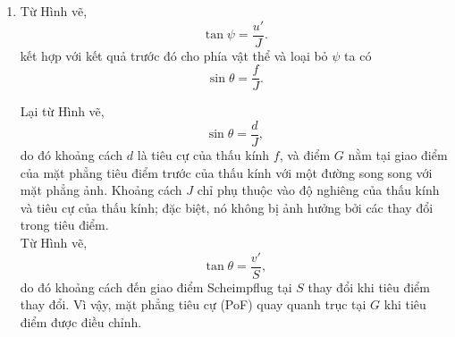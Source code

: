 \begin{enumerate}[label=(\alph*)]
\item Từ Hình vẽ,
\begin{equation}
\tan \psi = \dfrac{u'}{J}.
\end{equation}
kết hợp với kết quả trước đó cho phía vật thể và loại bỏ $\psi$ ta có
\begin{equation}
\sin \theta = \dfrac{f}{J}.
\end{equation}

Lại từ Hình vẽ,
\begin{equation}
\label{eq:S2_03}
\sin \theta = \frac{d}{J},
\end{equation}
do đó khoảng cách $d$ là tiêu cự của thấu kính $f$, và điểm $G$ nằm tại giao điểm của mặt phẳng tiêu điểm trước của thấu kính với một đường song song với mặt phẳng ảnh. Khoảng cách $J$ chỉ phụ thuộc vào độ nghiêng của thấu kính và tiêu cự của thấu kính; đặc biệt, nó không bị ảnh hưởng bởi các thay đổi trong tiêu điểm.
\\Từ Hình vẽ,
\begin{equation}
\label{eq:S2_04}
\tan \theta = \dfrac{v'}{S},
\end{equation}
do đó khoảng cách đến giao điểm Scheimpflug tại $S$ thay đổi khi tiêu điểm thay đổi. Vì vậy, mặt phẳng tiêu cự (PoF) quay quanh trục tại $G$ khi tiêu điểm được điều chỉnh.


\end{enumerate}
